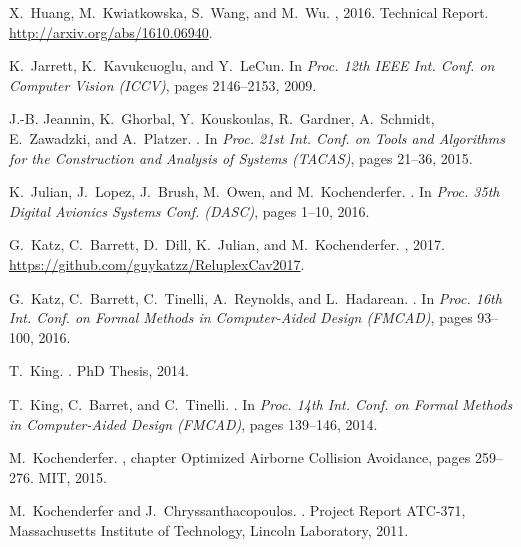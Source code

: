 \documentclass[a4paper]{llncs}
\begin{document}
{\begin{thebibliography}{10}
X.~Huang, M.~Kwiatkowska, S.~Wang, and M.~Wu.
, 2016.
\newblock Technical Report. \url{http://arxiv.org/abs/1610.06940}.

K.~Jarrett, K.~Kavukcuoglu, and Y.~LeCun.
\newblock In {\em Proc. 12th IEEE Int. Conf. on Computer Vision (ICCV)}, pages
  2146--2153, 2009.

J.-B. Jeannin, K.~Ghorbal, Y.~Kouskoulas, R.~Gardner, A.~Schmidt, E.~Zawadzki,
  and A.~Platzer.
.
\newblock In {\em Proc. 21st Int. Conf. on Tools and Algorithms for the
  Construction and Analysis of Systems (TACAS)}, pages 21--36, 2015.

K.~Julian, J.~Lopez, J.~Brush, M.~Owen, and M.~Kochenderfer.
.
\newblock In {\em Proc. 35th Digital Avionics Systems Conf. (DASC)}, pages
  1--10, 2016.

G.~Katz, C.~Barrett, D.~Dill, K.~Julian, and M.~Kochenderfer.
, 2017.
\newblock \url{https://github.com/guykatzz/ReluplexCav2017}.

G.~Katz, C.~Barrett, C.~Tinelli, A.~Reynolds, and L.~Hadarean.
.
\newblock In {\em Proc. 16th Int. Conf. on Formal Methods in Computer-Aided
  Design (FMCAD)}, pages 93--100, 2016.

T.~King.
.
\newblock PhD Thesis, 2014.

T.~King, C.~Barret, and C.~Tinelli.
.
\newblock In {\em Proc. 14th Int. Conf. on Formal Methods in Computer-Aided
  Design (FMCAD)}, pages 139--146, 2014.

M.~Kochenderfer.
,
  chapter Optimized Airborne Collision Avoidance, pages 259--276.
\newblock MIT, 2015.

M.~Kochenderfer and J.~Chryssanthacopoulos.
.
\newblock Project Report ATC-371, Massachusetts Institute of Technology,
  Lincoln Laboratory, 2011.


\end{thebibliography}}
\end{document}
